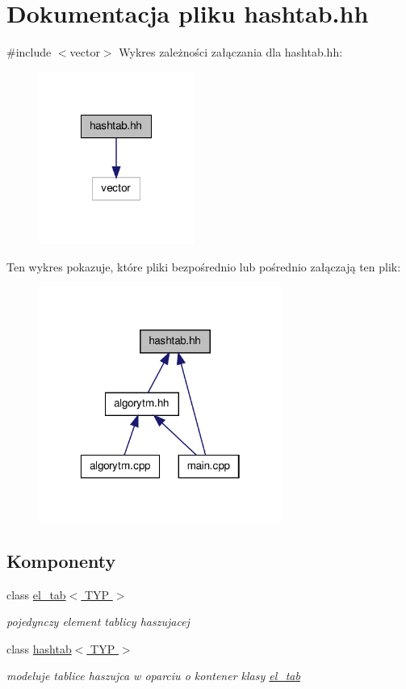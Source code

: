 \hypertarget{hashtab_8hh}{\section{\-Dokumentacja pliku hashtab.\-hh}
\label{hashtab_8hh}
}
{\ttfamily \#include $<$vector$>$}\*
\-Wykres zależności załączania dla hashtab.\-hh\-:\nopagebreak
\begin{figure}[H]
\begin{center}
\leavevmode
\includegraphics[width=144pt]{hashtab_8hh__incl}
\end{center}
\end{figure}
\-Ten wykres pokazuje, które pliki bezpośrednio lub pośrednio załączają ten plik\-:\nopagebreak
\begin{figure}[H]
\begin{center}
\leavevmode
\includegraphics[width=226pt]{hashtab_8hh__dep__incl}
\end{center}
\end{figure}
\subsection*{\-Komponenty}
\begin{DoxyCompactItemize}
\item 
class \hyperlink{classel__tab}{el\-\_\-tab$<$ T\-Y\-P $>$}
\begin{DoxyCompactList}\small\item\em pojedynczy element tablicy haszujacej \end{DoxyCompactList}\item 
class \hyperlink{classhashtab}{hashtab$<$ T\-Y\-P $>$}
\begin{DoxyCompactList}\small\item\em modeluje tablice haszujca w oparciu o kontener klasy \hyperlink{classel__tab}{el\-\_\-tab} \end{DoxyCompactList}\end{DoxyCompactItemize}


